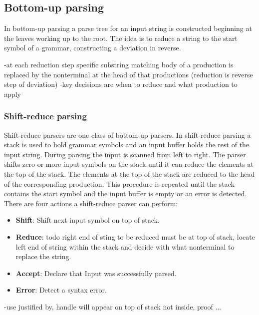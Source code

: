 \subsection{Bottom-up parsing}\label{sec:BackgroundParserBottomUp}

In bottom-up parsing a parse tree for an input string is constructed beginning at the leaves working up to the root. The idea is to reduce a string to the start symbol of a grammar, constructing a deviation in reverse.
\cite{Aho.2007}

-at each reduction step specific substring matching body of a production is replaced by the nonterminal at the head of that productions (reduction is reverse step of deviation)
-key decisions are when to reduce and what production to apply

\subsubsection{Shift-reduce parsing}\label{sec:BackgroundParserShiftReduce}

Shift-reduce parsers are one class of bottom-up parsers. In shift-reduce parsing a stack is used to hold grammar symbols and an input buffer holds the rest of the input string.
During parsing the input is scanned from left to right. The parser shifts zero or more input symbols on the stack until it can reduce the elements at the top of the stack. The elements at the top of the stack are reduced to the head of the corresponding production. This procedure is repeated until the stack contains the start symbol and the input buffer is empty or an error is detected. \cite{Aho.2007}\\
There are four actions a shift-reduce parser can perform:
\begin{itemize}%
	\item \textbf{Shift}: Shift next input symbol on top of stack.
	\item \textbf{Reduce}: todo right end of sting to be reduced must be at top of stack, locate left end of string within the stack and decide with what nonterminal to replace the string.
	\item \textbf{Accept}: Declare that Input was successfully parsed.
	\item \textbf{Error}: Detect a syntax error.
\end{itemize}
\cite{Aho.2007}

-use justified by, handle will appear on top of stack not inside, proof ...


